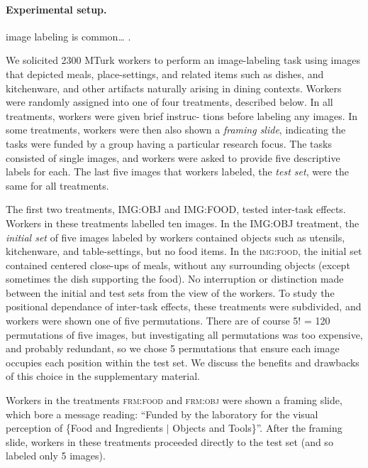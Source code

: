 \documentclass[12pt]{article}
\begin{document}
\paragraph{Experimental setup.}

image labeling is common\ldots
\cite{chandler2013breaking,Berinsky2012351,Finnerty2013,paolacci2010running}.  

We solicited 2300 MTurk workers to perform an image-labeling task using images 
that depicted meals, place-settings, and related items such as dishes, and 
kitchenware, and other artifacts naturally arising in dining contexts. Workers 
were randomly assigned into one of four treatments, described below. In all 
treatments, workers were given brief instruc- tions before labeling any images.
In some treatments, workers were then also shown a \textit{framing slide}, 
indicating 
the tasks were funded by a group having a particular research focus. The tasks 
consisted of single images, and workers were asked to provide five descriptive 
labels for each. The last five images that workers labeled, the 
\textit{test set}, were the same for all treatments.

The first two treatments, IMG:OBJ and IMG:FOOD, tested inter-task effects. 
Workers in these treatments labelled ten images. In the IMG:OBJ treatment, the 
\textit{initial set} of five images labeled by workers contained objects such 
as utensils, kitchenware, and table-settings, but no food items. In the 
\textsc{img:food}, the initial set contained centered close-ups of meals, 
without
any surrounding objects (except sometimes the dish supporting the food). No 
interruption or distinction made between the initial and test sets from the 
view of the workers. To study the positional dependance of inter-task effects,
these treatments were subdivided, and workers were shown one of five 
permutations. There are of course 5! = 120 permutations of five images, but 
investigating all permutations was too expensive, and probably redundant, so 
we chose 5 permutations that ensure each image occupies each position within 
the test set. We discuss the benefits and drawbacks of this choice in the 
supplementary material.

Workers in the treatments \textsc{frm:food} and \textsc{frm:obj} were shown a 
framing slide, which bore a message reading: ``Funded by the laboratory for 
the visual perception of \{Food and Ingredients $\vert$ Objects and Tools\}''. 
After the framing slide, workers in these treatments proceeded directly to 
the test set (and so labeled only 5 images).
\end{document}
